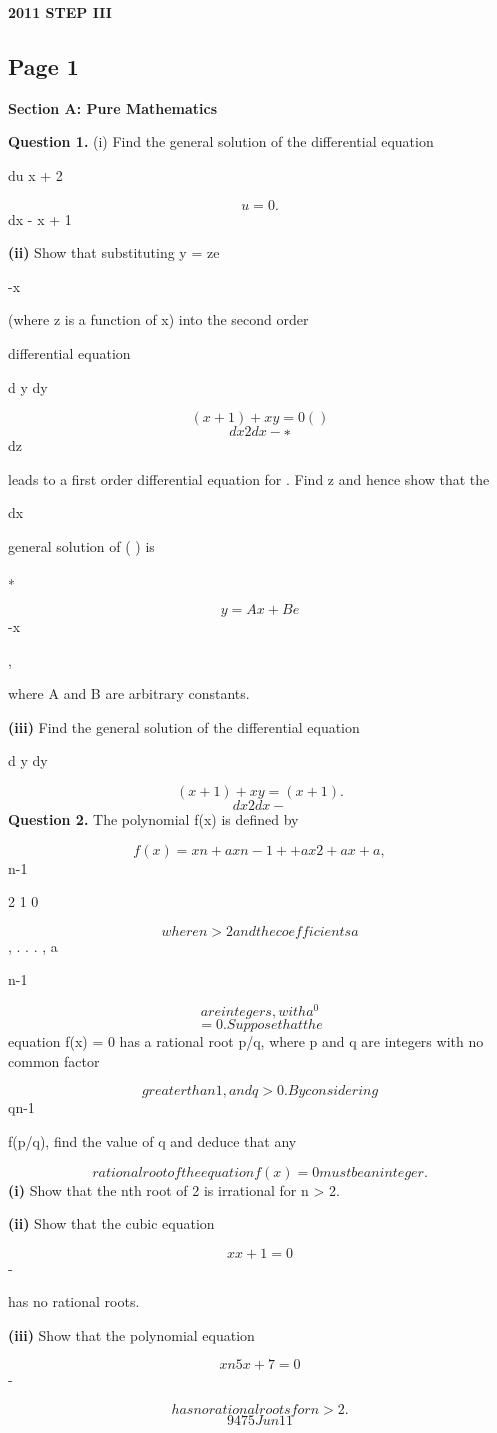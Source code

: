 \documentclass[12pt]{article}
\begin{document}
\begin{center}
{\Large \textbf{2011 STEP III}}
\end{center}

\subsection*{Page 1}
\begin{flushleft}
\bigskip\textbf{Section A: Pure Mathematics}\par
\bigskip\textbf{Question 1.} (i) Find the general solution of the differential equation\par
du x + 2\par
\[u = 0 .\]
dx - \lambda x + 1 \mu\par
\textbf{(ii)} Show that substituting y = ze\par
-x\par
(where z is a function of x) into the second order\par
differential equation\par
d y dy\par
\[(x + 1) + x y = 0 ( )\]
\[dx2 dx - ∗\]
dz\par
leads to a first order differential equation for . Find z and hence show that the\par
dx\par
general solution of ( ) is\par
∗\par
\[y = Ax + Be\]
-x\par
,\par
where A and B are arbitrary constants.\par
\textbf{(iii)} Find the general solution of the differential equation\par
d y dy\par
\[(x + 1) + x y = (x + 1) .\]
\[dx2 dx -\]
\bigskip\textbf{Question 2.} The polynomial f(x) is defined by\par
\[f(x) = xn + a xn-1 + + a x 2 + a x + a ,\]
n-1\par
\cdots\par
2 1 0\par
\[where n > 2 and the coefficients a\]
, . . . , a\par
n-1\par
\[are integers, with a^0\]
\[= 0. Suppose that the\]
equation f(x) = 0 has a rational root p/q, where p and q are integers with no common factor\par
\[greater than 1, and q > 0. By considering\]
qn-1\par
f(p/q), find the value of q and deduce that any\par
\[rational root of the equation f(x) = 0 must be an integer.\]
\textbf{(i)} Show that the nth root of 2 is irrational for n > 2.\par
\textbf{(ii)} Show that the cubic equation\par
\[x x + 1 = 0\]
-\par
has no rational roots.\par
\textbf{(iii)} Show that the polynomial equation\par
\[xn 5x + 7 = 0\]
-\par
\[has no rational roots for n > 2.\]
\[9475 Jun11\]
\end{flushleft}
\end{document}
